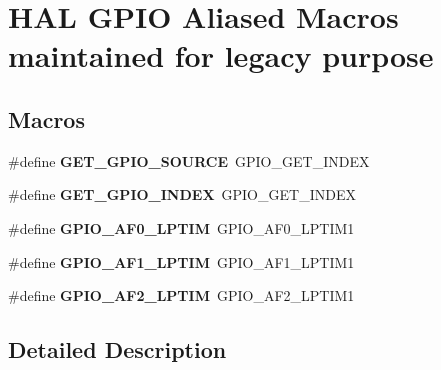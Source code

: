 \hypertarget{group___h_a_l___g_p_i_o___aliased___macros}{\section{H\-A\-L G\-P\-I\-O Aliased Macros maintained for legacy purpose}
\label{group___h_a_l___g_p_i_o___aliased___macros}
}
\subsection*{Macros}
\begin{DoxyCompactItemize}
\item 
\hypertarget{group___h_a_l___g_p_i_o___aliased___macros_ga519fafd507db0341f56b24e6f5509561}{\#define {\bfseries G\-E\-T\-\_\-\-G\-P\-I\-O\-\_\-\-S\-O\-U\-R\-C\-E}~G\-P\-I\-O\-\_\-\-G\-E\-T\-\_\-\-I\-N\-D\-E\-X}\label{group___h_a_l___g_p_i_o___aliased___macros_ga519fafd507db0341f56b24e6f5509561}

\item 
\hypertarget{group___h_a_l___g_p_i_o___aliased___macros_ga1c140fcfc79bb7185eed044b05792d70}{\#define {\bfseries G\-E\-T\-\_\-\-G\-P\-I\-O\-\_\-\-I\-N\-D\-E\-X}~G\-P\-I\-O\-\_\-\-G\-E\-T\-\_\-\-I\-N\-D\-E\-X}\label{group___h_a_l___g_p_i_o___aliased___macros_ga1c140fcfc79bb7185eed044b05792d70}

\item 
\hypertarget{group___h_a_l___g_p_i_o___aliased___macros_gab7abf9473a43a0b3d2c494d9946ef5ab}{\#define {\bfseries G\-P\-I\-O\-\_\-\-A\-F0\-\_\-\-L\-P\-T\-I\-M}~G\-P\-I\-O\-\_\-\-A\-F0\-\_\-\-L\-P\-T\-I\-M1}\label{group___h_a_l___g_p_i_o___aliased___macros_gab7abf9473a43a0b3d2c494d9946ef5ab}

\item 
\hypertarget{group___h_a_l___g_p_i_o___aliased___macros_ga4dd6c2f7aa06ea43dd9e6fe568c34e60}{\#define {\bfseries G\-P\-I\-O\-\_\-\-A\-F1\-\_\-\-L\-P\-T\-I\-M}~G\-P\-I\-O\-\_\-\-A\-F1\-\_\-\-L\-P\-T\-I\-M1}\label{group___h_a_l___g_p_i_o___aliased___macros_ga4dd6c2f7aa06ea43dd9e6fe568c34e60}

\item 
\hypertarget{group___h_a_l___g_p_i_o___aliased___macros_ga93742854899db59892aa438ce7c8a2d6}{\#define {\bfseries G\-P\-I\-O\-\_\-\-A\-F2\-\_\-\-L\-P\-T\-I\-M}~G\-P\-I\-O\-\_\-\-A\-F2\-\_\-\-L\-P\-T\-I\-M1}\label{group___h_a_l___g_p_i_o___aliased___macros_ga93742854899db59892aa438ce7c8a2d6}

\end{DoxyCompactItemize}


\subsection{Detailed Description}
